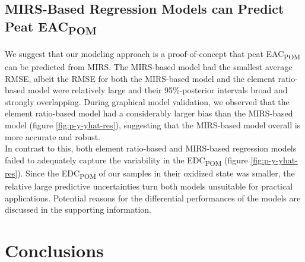 \documentclass[alpha-refs, lineno]{wiley-article-rmd}
\begin{document}
\hypertarget{mirs-based-regression-models-can-predict-peat-eac}{%
\subsection{\texorpdfstring{MIRS-Based Regression Models can Predict Peat EAC\textsubscript{POM}}{MIRS-Based Regression Models can Predict Peat EAC}}\label{mirs-based-regression-models-can-predict-peat-eac}}

We suggest that our modeling approach is a proof-of-concept that peat EAC\textsubscript{POM} can be predicted from MIRS. The MIRS-based model had the smallest average RMSE, albeit the RMSE for both the MIRS-based model and the element ratio-based model were relatively large and their 95\%-posterior intervals broad and strongly overlapping. During graphical model validation, we observed that the element ratio-based model had a considerably larger bias than the MIRS-based model (figure \ref{fig:p-y-yhat-res}), suggesting that the MIRS-based model overall is more accurate and robust.\\
In contrast to this, both element ratio-based and MIRS-based regression models failed to adequately capture the variability in the EDC\textsubscript{POM} (figure \ref{fig:p-y-yhat-res}). Since the EDC\textsubscript{POM} of our samples in their oxidized state was smaller, the relative large predictive uncertainties turn both models unsuitable for practical applications.
Potential reasons for the differential performances of the models are discussed in the supporting information.

\hypertarget{conclusions}{%
\section{Conclusions}\label{conclusions}}
\end{document}
